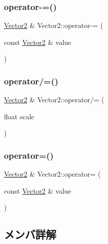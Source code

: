 \subsubsection{\texorpdfstring{operator-\/=()}{operator-=()}}
{\footnotesize\ttfamily \mbox{\hyperlink{struct_math_1_1_vector2}{Vector2}} \& Vector2\+::operator-\/= (\begin{DoxyParamCaption}\item[{const \mbox{\hyperlink{struct_math_1_1_vector2}{Vector2}} \&}]{value }\end{DoxyParamCaption})}

\mbox{\label{struct_math_1_1_vector2_aa273b2243920d3d13f2298e33e8e8d03}} 
\subsubsection{\texorpdfstring{operator/=()}{operator/=()}}
{\footnotesize\ttfamily \mbox{\hyperlink{struct_math_1_1_vector2}{Vector2}} \& Vector2\+::operator/= (\begin{DoxyParamCaption}\item[{float}]{scale }\end{DoxyParamCaption})}

\mbox{\label{struct_math_1_1_vector2_a89e1656f8a3a65c531a06fc80e441008}} 
\subsubsection{\texorpdfstring{operator=()}{operator=()}}
{\footnotesize\ttfamily \mbox{\hyperlink{struct_math_1_1_vector2}{Vector2}} \& Vector2\+::operator= (\begin{DoxyParamCaption}\item[{const \mbox{\hyperlink{struct_math_1_1_vector2}{Vector2}} \&}]{value }\end{DoxyParamCaption})}



\subsection{メンバ詳解}
\mbox{\label{struct_math_1_1_vector2_a32d5ba430ca4426f90166af92e7bfd10}} 

